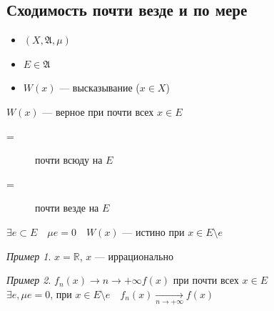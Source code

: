 \documentclass[oneside]{book}
\newcommand{\R}{\mathbb{R}}
\newcommand{\A}{\mathfrak{A}}
\theoremstyle{plain}
\theoremstyle{remark}
\newtheorem*{examp}{Пример}
\theoremstyle{definition}
\begin{document}
\subsection{Сходимость почти везде и по мере}
\label{sec:orgbaf34a4}
\begin{defintion}
\begin{itemize}
\item \((X, \A, \mu)\)
\item \(E \in \A\)
\item \(W(x)\) --- высказывание (\(x\in X\))
\end{itemize}
\(W(x)\) --- верное при почти всех \(x \in E\)
\begin{description}
\item[{=}] почти всюду на \(E\)
\item[{=}] почти везде на \(E\)
\end{description}
\(\exists e \subset E\quad \mu e= 0\quad W(x)\) --- истино при \(x \in E \setminus e\)
\end{defintion}
\begin{examp}
\(x = \R\), \(x\) --- иррационально
\end{examp}
\begin{examp}
\(f_n(x) \xrightarrow{}{n \to + \infty} f(x)\) при почти всех \(x \in E\) \\
\(\exists e, \mu e = 0\), при \(x\in E \setminus e\quad f_n(x) \xrightarrow[n \to + \infty]{}f(x)\) \\
\end{examp}
\end{document}

